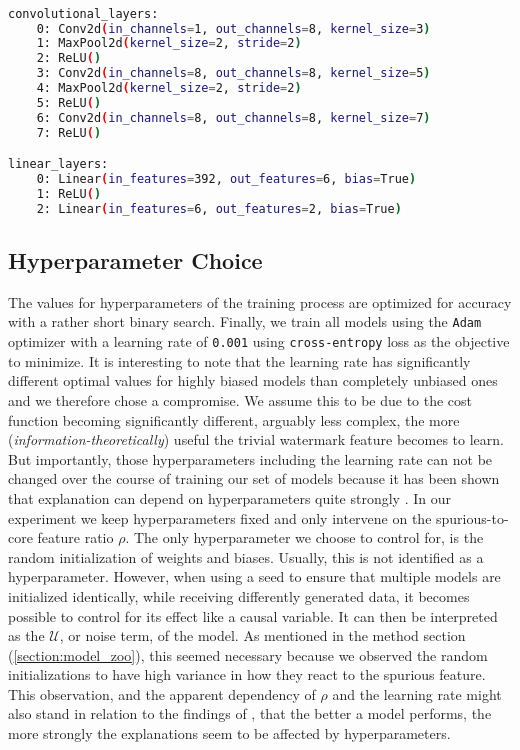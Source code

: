 \begin{lstlisting}[language=bash, label=lst:cnnmodel]

convolutional_layers: 
    0: Conv2d(in_channels=1, out_channels=8, kernel_size=3)
    1: MaxPool2d(kernel_size=2, stride=2)
    2: ReLU()
    3: Conv2d(in_channels=8, out_channels=8, kernel_size=5)
    4: MaxPool2d(kernel_size=2, stride=2)
    5: ReLU()
    6: Conv2d(in_channels=8, out_channels=8, kernel_size=7)
    7: ReLU()

linear_layers:
    0: Linear(in_features=392, out_features=6, bias=True)
    1: ReLU()
    2: Linear(in_features=6, out_features=2, bias=True)  

\end{lstlisting}

\subsection{Hyperparameter Choice}
The values for hyperparameters of the training process are optimized for accuracy with a rather short binary search. Finally, we train all models using the \verb|Adam| optimizer with a learning rate of \verb|0.001| using \verb|cross-entropy| loss as the objective to minimize. 
It is interesting to note that the learning rate has significantly different optimal values for highly biased models than completely unbiased ones and we therefore chose a compromise. We assume this to be due to the cost function becoming significantly different, arguably less complex, the more (\textit{information-theoretically}) useful the trivial watermark feature becomes to learn.
But importantly, those hyperparameters including the learning rate can not be changed over the course of training our set of models because it has been shown that explanation can depend on hyperparameters quite strongly \citep{Karimi2023}.
In our experiment we keep hyperparameters fixed and only intervene on the spurious-to-core feature ratio $\rho$. The only hyperparameter we choose to control for, is the random initialization of weights and biases. Usually, this is not identified as a hyperparameter. However, when using a seed to ensure that multiple models are initialized identically, while receiving differently generated data, it becomes possible to control for its effect like a causal variable. It can then be interpreted as the $\mathcal{U}$, or noise term, of the model.
As mentioned in the method section (\ref{section:model_zoo}), this seemed necessary because we observed the random initializations to have high variance in how they react to the spurious feature. This observation, and the apparent dependency of $\rho$ and the learning rate might also stand in relation to the findings of \cite{Karimi2023}, that the better a model performs, the more strongly the explanations seem to be affected by hyperparameters.

